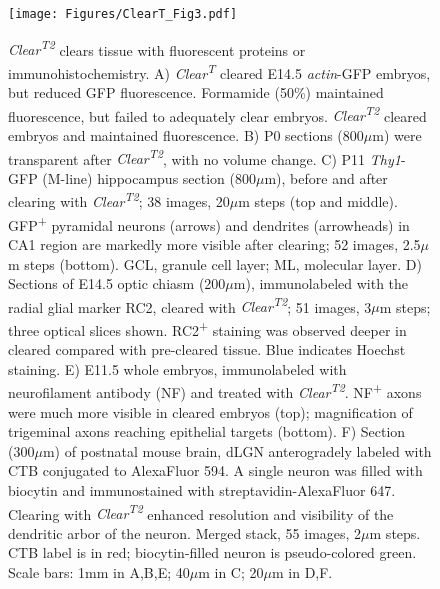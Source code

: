 \begin{figure}[hbtp]
    \begin{center}
        \texttt{[image: Figures/ClearT\_Fig3.pdf]}
        \caption[\emph{Clear\textsuperscript{T2}} clears tissue with fluorescent proteins or immunohistochemistry.]
        {\emph{Clear\textsuperscript{T2}} clears tissue with fluorescent proteins or immunohistochemistry.
        A) \emph{Clear\textsuperscript{T}} cleared E14.5 \emph{actin}-GFP embryos, but reduced GFP fluorescence.
        Formamide (50\%) maintained fluorescence, but failed to adequately clear embryos.
        \emph{Clear\textsuperscript{T2}} cleared embryos and maintained fluorescence.
        B) P0 sections (800$\mu$m) were transparent after \emph{Clear\textsuperscript{T2}}, with no volume change.
        C) P11 \emph{Thy1}-GFP (M-line) hippocampus section (800$\mu$m), before and after clearing with \emph{Clear\textsuperscript{T2}}; 38 images, 20$\mu$m steps (top and middle).
        GFP\textsuperscript{+} pyramidal neurons (arrows) and dendrites (arrowheads) in CA1 region are markedly more visible after clearing; 52 images, 2.5$\mu$m steps (bottom).
        GCL, granule cell layer; ML, molecular layer.
        D) Sections of E14.5 optic chiasm (200$\mu$m), immunolabeled with the radial glial marker RC2, cleared with \emph{Clear\textsuperscript{T2}}; 51 images, 3$\mu$m steps; three optical slices shown.
        RC2\textsuperscript{+} staining was observed deeper in cleared compared with pre-cleared tissue.
        Blue indicates Hoechst staining.
        E) E11.5 whole embryos, immunolabeled with neurofilament antibody (NF) and treated with \emph{Clear\textsuperscript{T2}}.
        NF\textsuperscript{+} axons were much more visible in cleared embryos (top); magnification of trigeminal axons reaching epithelial targets (bottom).
        F) Section (300$\mu$m) of postnatal mouse brain, dLGN anterogradely labeled with CTB conjugated to AlexaFluor 594.
        A single neuron was filled with biocytin and immunostained with streptavidin-AlexaFluor 647.
        Clearing with \emph{Clear\textsuperscript{T2}} enhanced resolution and visibility of the dendritic arbor of the neuron.
        Merged stack, 55 images, 2$\mu$m steps.
        CTB label is in red; biocytin-filled neuron is pseudo-colored green. Scale bars: 1mm in A,B,E; 40$\mu$m in C; 20$\mu$m in D,F.
        }
        \label{ClearTFig3}
    \end{center}
\end{figure}

